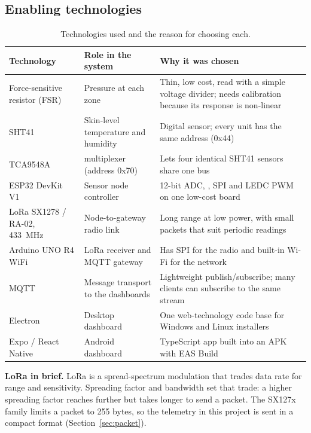 \subsection{Enabling technologies}
{\small{}
\begin{table}[H]
\centering
\begin{tabularx}{\textwidth}{@{}>{\raggedright\arraybackslash}p{3.4cm}>{\raggedright\arraybackslash}p{3.6cm}X@{}}
\toprule
\textbf{Technology} & \textbf{Role in the system} & \textbf{Why it was chosen}\\
\midrule
Force-sensitive resistor (FSR) & Pressure at each zone & Thin, low cost, read with a simple voltage divider; needs calibration because its response is non-linear\\
SHT41~\cite{sensirion_sht4x} & Skin-level temperature and humidity & Digital \itwoc{} sensor; every unit has the same address (0x44)\\
TCA9548A~\cite{ti_tca9548a} & \itwoc{} multiplexer (address 0x70) & Lets four identical SHT41 sensors share one bus\\
ESP32 DevKit V1~\cite{espressif_esp32} & Sensor node controller & 12-bit ADC, \itwoc{}, SPI and LEDC PWM on one low-cost board\\
LoRa SX1278 / RA-02, 433~MHz~\cite{semtech_sx1278,loraalliance} & Node-to-gateway radio link & Long range at low power, with small packets that suit periodic readings\\
Arduino UNO R4 WiFi~\cite{arduino_r4} & LoRa receiver and MQTT gateway & Has SPI for the radio and built-in Wi-Fi for the network\\
MQTT~\cite{oasis_mqtt} & Message transport to the dashboards & Lightweight publish/subscribe; many clients can subscribe to the same stream\\
Electron~\cite{electron} & Desktop dashboard & One web-technology code base for Windows and Linux installers\\
Expo / React Native~\cite{expo} & Android dashboard & TypeScript app built into an APK with EAS Build\\
\bottomrule
\end{tabularx}
\caption{Technologies used and the reason for choosing each.}
\end{table}}

\textbf{LoRa in brief.} LoRa is a spread-spectrum modulation that trades data rate for range and sensitivity. Spreading factor and bandwidth set that trade: a higher spreading factor reaches further but takes longer to send a packet. The SX127x family limits a packet to 255 bytes, so the telemetry in this project is sent in a compact format (Section~\ref{sec:packet}).

